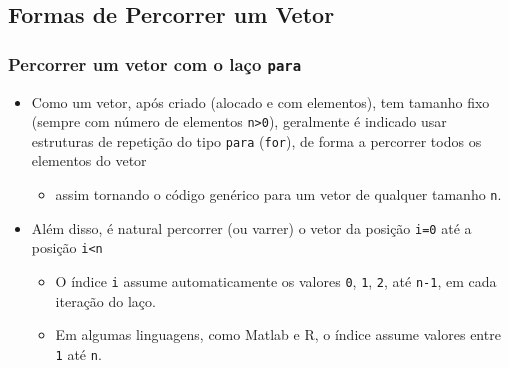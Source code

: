 \documentclass[12pt,a4paper]{article}
\providecommand{\tightlist}{%
      \setlength{\itemsep}{0pt}\setlength{\parskip}{0pt}}
\begin{document}
    \hypertarget{formas-de-percorrer-um-vetor}{%
\subsection{Formas de Percorrer um
Vetor}\label{formas-de-percorrer-um-vetor}}

    \hypertarget{percorrer-um-vetor-com-o-lauxe7o-para}{%
\subsubsection{\texorpdfstring{Percorrer um vetor com o laço
\texttt{para}}{Percorrer um vetor com o laço para}}\label{percorrer-um-vetor-com-o-lauxe7o-para}}

    \begin{itemize}
\tightlist
\item
  Como um vetor, após criado (alocado e com elementos), tem tamanho fixo
  (sempre com número de elementos \texttt{n\textgreater{}0}), geralmente
  é indicado usar estruturas de repetição do tipo \texttt{para}
  (\texttt{for}), de forma a percorrer todos os elementos do vetor

  \begin{itemize}
  \tightlist
  \item
    assim tornando o código genérico para um vetor de qualquer tamanho
    \texttt{n}.
  \end{itemize}
\item
  Além disso, é natural percorrer (ou varrer) o vetor da posição
  \texttt{i=0} até a posição \texttt{i\textless{}n}

  \begin{itemize}
  \tightlist
  \item
    O índice \texttt{i} assume automaticamente os valores \texttt{0},
    \texttt{1}, \texttt{2}, até \texttt{n-1}, em cada iteração do
    laço.\\
  \item
    Em algumas linguagens, como Matlab e R, o índice assume valores
    entre \texttt{1} até \texttt{n}.
  \end{itemize}
\end{itemize}
\end{document}
